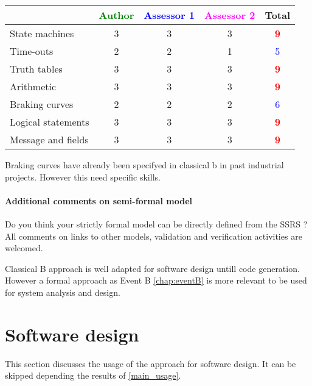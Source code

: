 \begin{tabular}{|l | c | c | c | c|}
\hline
& \textcolor{green}{Author} & \textcolor{blue}{Assessor 1} & \textcolor{magenta}{Assessor 2} & Total \\
\hline 
State machines  & 3    & 3    & 3    & \textcolor{red}{\textbf{9}} \\
\hline
Time-outs  & 2    & 2    & 1    & \textcolor{blue}{5} \\
\hline
Truth tables  & 3    & 3    & 3    & \textcolor{red}{\textbf{9}} \\
\hline
Arithmetic  & 3    & 3    & 3    & \textcolor{red}{\textbf{9}} \\
\hline
Braking curves  & 2    & 2    & 2    & \textcolor{blue}{6} \\
\hline
Logical statements & 3    & 3    & 3     & \textcolor{red}{\textbf{9}} \\
\hline
Message and fields & 3    & 3    & 3    & \textcolor{red}{\textbf{9}} \\
\hline
\end{tabular}


\begin{author_comment}
Braking curves have already been specifyed in classical b  in past industrial projects. However this need specific skills.
\end{author_comment}


\paragraph{Additional comments on semi-formal  model} Do you think your strictly formal  model can be directly defined from the SSRS ?
All comments on links to  other models, validation and verification activities are welcomed.



\begin{author_comment}
Classical B  approach is well adapted for software design untill code generation. However a formal approach as Event B \ref{chap:eventB} is more relevant to be used for system analysis and design.
\end{author_comment}


\section{Software design}
This section discusses the usage of the approach for software design.
It can be skipped depending the results of \ref{main_usage}.

